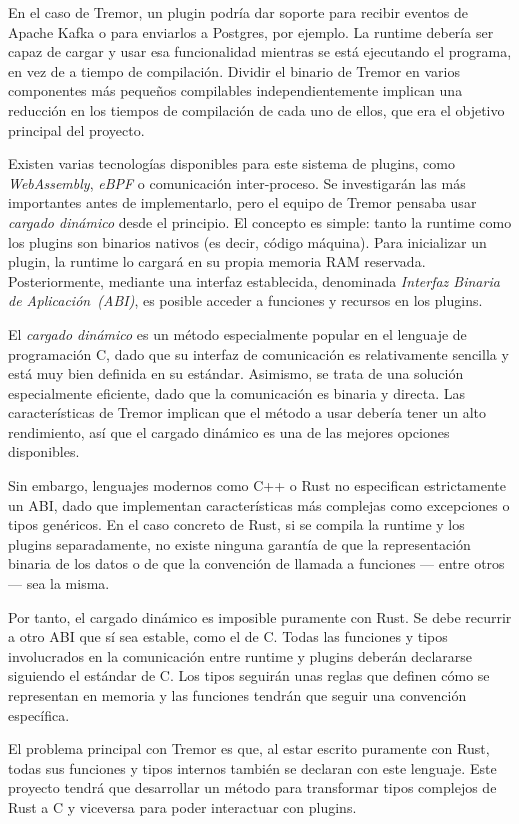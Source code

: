 En el caso de Tremor, un plugin podría dar soporte para recibir eventos de
Apache Kafka o para enviarlos a Postgres, por ejemplo. La runtime debería ser
capaz de cargar y usar esa funcionalidad mientras se está ejecutando el
programa, en vez de a tiempo de compilación. Dividir el binario de Tremor en
varios componentes más pequeños compilables independientemente implican una
reducción en los tiempos de compilación de cada uno de ellos, que era el
objetivo principal del proyecto.

Existen varias tecnologías disponibles para este sistema de plugins, como
\emph{WebAssembly}, \emph{eBPF} o comunicación inter-proceso. Se investigarán
las más importantes antes de implementarlo, pero el equipo de Tremor pensaba
usar \emph{cargado dinámico} desde el principio. El concepto es simple: tanto la
runtime como los plugins son binarios nativos (es decir, código máquina). Para
inicializar un plugin, la runtime lo cargará en su propia memoria RAM reservada.
Posteriormente, mediante una interfaz establecida, denominada \emph{Interfaz
Binaria de Aplicación~(ABI)}, es posible acceder a funciones y recursos en los
plugins.

El \emph{cargado dinámico} es un método especialmente popular en el lenguaje de
programación C, dado que su interfaz de comunicación es relativamente sencilla y
está muy bien definida en su estándar. Asimismo, se trata de una solución
especialmente eficiente, dado que la comunicación es binaria y directa. Las
características de Tremor implican que el método a usar debería tener un alto
rendimiento, así que el cargado dinámico es una de las mejores opciones
disponibles.

Sin embargo, lenguajes modernos como C++ o Rust no especifican estrictamente un
ABI, dado que implementan características más complejas como excepciones o tipos
genéricos. En el caso concreto de Rust, si se compila la runtime y los plugins
separadamente, no existe ninguna garantía de que la representación binaria de
los datos o de que la convención de llamada a funciones --- entre otros --- sea
la misma.

Por tanto, el cargado dinámico es imposible puramente con Rust. Se debe recurrir
a otro ABI que sí sea estable, como el de C. Todas las funciones y tipos
involucrados en la comunicación entre runtime y plugins deberán declararse
siguiendo el estándar de C. Los tipos seguirán unas reglas que definen cómo se
representan en memoria y las funciones tendrán que seguir una convención
específica.

El problema principal con Tremor es que, al estar escrito puramente con Rust,
todas sus funciones y tipos internos también se declaran con este lenguaje. Este
proyecto tendrá que desarrollar un método para transformar tipos complejos de
Rust a C y viceversa para poder interactuar con plugins.

